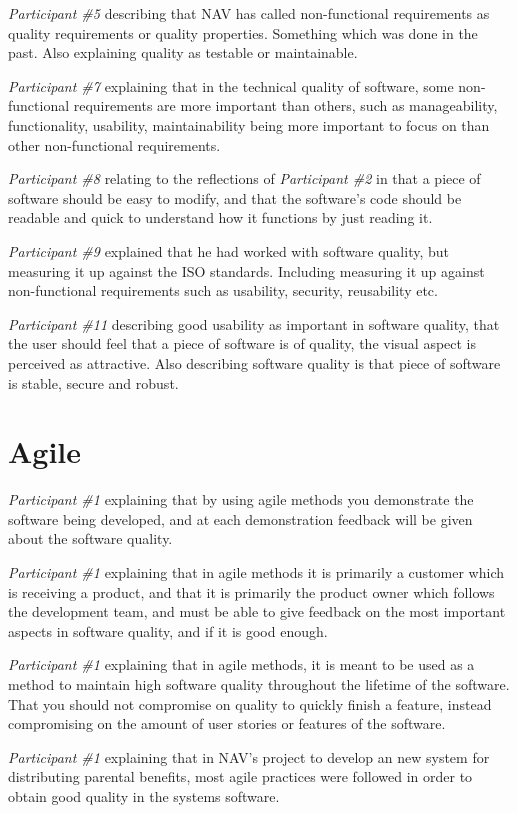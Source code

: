 \textit{Participant \#5} describing that NAV has called non-functional requirements as quality requirements or quality properties. Something which was done in the past. Also explaining quality as testable or maintainable.

\textit{Participant \#7} explaining that in the technical quality of software, some non-functional requirements are more important than others, such as manageability, functionality, usability, maintainability being more important to focus on than other non-functional requirements. 

\textit{Participant \#8} relating to the reflections of \textit{Participant \#2} in that a piece of software should be easy to modify, and that the software's code should be readable and quick to understand how it functions by just reading it.

\textit{Participant \#9} explained that he had worked with software quality, but measuring it up against the ISO standards. Including measuring it up against non-functional requirements such as usability, security, reusability etc. 

\textit{Participant \#11} describing good usability as important in software quality, that the user should feel that a piece of software is of quality, the visual aspect is perceived as attractive. Also describing software quality is that piece of software is stable, secure and robust.

\section{Agile}
\textit{Participant \#1} explaining that by using agile methods you demonstrate the software being developed, and at each demonstration feedback will be given about the software quality.

\textit{Participant \#1} explaining that in agile methods it is primarily a customer which is receiving a product, and that it is primarily the product owner which follows the development team, and must be able to give feedback on the most important aspects in software quality, and if it is good enough.

\textit{Participant \#1} explaining that in agile methods, it is meant to be used as a method to maintain high software quality throughout the lifetime of the software. That you should not compromise on quality to quickly finish a feature, instead compromising on the amount of user stories or features of the software.

\textit{Participant \#1} explaining that in NAV's project to develop an new system for distributing parental benefits, most agile practices were followed in order to obtain good quality in the systems software.

